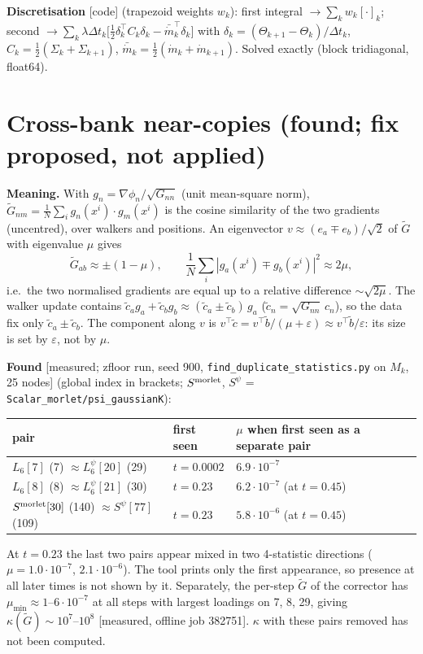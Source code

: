 \documentclass[11pt,a4paper]{article}
\begin{document}
\textbf{Discretisation} [code] (trapezoid weights $w_k$): first integral $\to\sum_kw_k[\cdot]_k$; second
$\to\sum_k\lambda\Delta t_k\big[\tfrac12\delta_k^\top C_k\delta_k-\bar{\dot m}_k^\top\delta_k\big]$ with
$\delta_k=(\Theta_{k+1}-\Theta_k)/\Delta t_k$, $C_k=\tfrac12(\Sigma_k+\Sigma_{k+1})$, $\bar{\dot m}_k=\tfrac12(\dot m_k+\dot m_{k+1})$.
Solved exactly (block tridiagonal, float64).

\section{Cross-bank near-copies \hfill\small(found; fix proposed, not applied)}
\textbf{Meaning.} With $g_n=\nabla\phi_n/\sqrt{G_{nn}}$ (unit mean-square norm),
$\tilde G_{nm}=\frac1N\sum_ig_n(x^i)\cdot g_m(x^i)$ is the cosine similarity of the two gradients (uncentred),
over walkers and positions. An eigenvector $v\approx(e_a\mp e_b)/\sqrt2$ of $\tilde G$ with eigenvalue $\mu$ gives
\[
\tilde G_{ab}\approx\pm(1-\mu),\qquad \frac1N\sum_i|g_a(x^i)\mp g_b(x^i)|^2\approx2\mu ,
\]
i.e.\ the two normalised gradients are equal up to a relative difference $\sim\sqrt{2\mu}$.
The walker update contains $\tilde c_ag_a+\tilde c_bg_b\approx(\tilde c_a\pm\tilde c_b)\,g_a$
($\tilde c_n=\sqrt{G_{nn}}\,c_n$), so the data fix only $\tilde c_a\pm\tilde c_b$. The component along $v$ is
$v^\top\tilde c=v^\top\tilde b/(\mu+\varepsilon)\approx v^\top\tilde b/\varepsilon$: its size is set by $\varepsilon$, not by $\mu$.

\textbf{Found} [measured; zfloor run, seed 900, \texttt{find\_duplicate\_statistics.py} on $M_k$, 25 nodes]
(global index in brackets; $S^{\rm morlet}$, $S^\psi$ = \texttt{Scalar\_morlet/psi\_gaussianK}):
\begin{center}\small\begin{tabular}{lll}\toprule
pair & first seen & $\mu$ when first seen as a separate pair\\\midrule
$L_6[7]$ (7) $\approx L_6^\psi[20]$ (29) & $t=0.0002$ & $6.9\cdot10^{-7}$\\
$L_6[8]$ (8) $\approx L_6^\psi[21]$ (30) & $t=0.23$ & $6.2\cdot10^{-7}$ (at $t=0.45$)\\
$S^{\rm morlet}[30]$ (140) $\approx S^\psi[77]$ (109) & $t=0.23$ & $5.8\cdot10^{-6}$ (at $t=0.45$)\\\bottomrule
\end{tabular}\end{center}
At $t=0.23$ the last two pairs appear mixed in two 4-statistic directions ($\mu=1.0\cdot10^{-7}$, $2.1\cdot10^{-6}$).
The tool prints only the first appearance, so presence at all later times is not shown by it.
Separately, the per-step $\tilde G$ of the corrector has $\mu_{\min}\approx1$--$6\cdot10^{-7}$ at all steps with largest
loadings on 7, 8, 29, giving $\kappa(\tilde G)\sim10^7$--$10^8$ [measured, offline job 382751]. $\kappa$ with these pairs
removed has not been computed.
\end{document}
